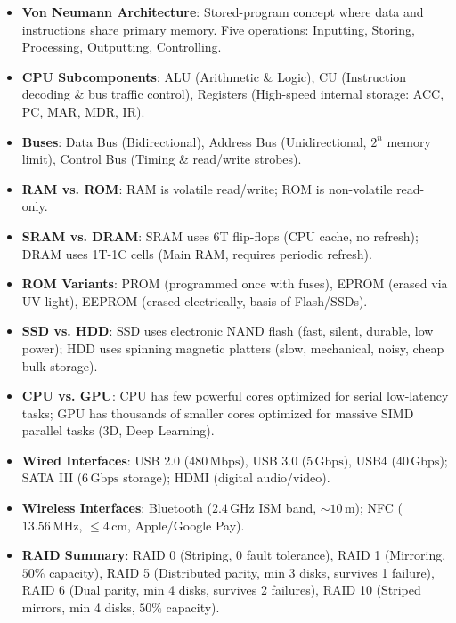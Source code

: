 \begin{quickrevision}
\begin{itemize}
    \item \textbf{Von Neumann Architecture}: Stored-program concept where data and instructions share primary memory. Five operations: Inputting, Storing, Processing, Outputting, Controlling.
    \item \textbf{CPU Subcomponents}: ALU (Arithmetic \& Logic), CU (Instruction decoding \& bus traffic control), Registers (High-speed internal storage: ACC, PC, MAR, MDR, IR).
    \item \textbf{Buses}: Data Bus (Bidirectional), Address Bus (Unidirectional, $2^n$ memory limit), Control Bus (Timing \& read/write strobes).
    \item \textbf{RAM vs. ROM}: RAM is volatile read/write; ROM is non-volatile read-only.
    \item \textbf{SRAM vs. DRAM}: SRAM uses 6T flip-flops (CPU cache, no refresh); DRAM uses 1T-1C cells (Main RAM, requires periodic refresh).
    \item \textbf{ROM Variants}: PROM (programmed once with fuses), EPROM (erased via UV light), EEPROM (erased electrically, basis of Flash/SSDs).
    \item \textbf{SSD vs. HDD}: SSD uses electronic NAND flash (fast, silent, durable, low power); HDD uses spinning magnetic platters (slow, mechanical, noisy, cheap bulk storage).
    \item \textbf{CPU vs. GPU}: CPU has few powerful cores optimized for serial low-latency tasks; GPU has thousands of smaller cores optimized for massive SIMD parallel tasks (3D, Deep Learning).
    \item \textbf{Wired Interfaces}: USB 2.0 ($480\,\text{Mbps}$), USB 3.0 ($5\,\text{Gbps}$), USB4 ($40\,\text{Gbps}$); SATA III ($6\,\text{Gbps}$ storage); HDMI (digital audio/video).
    \item \textbf{Wireless Interfaces}: Bluetooth ($2.4\,\text{GHz}$ ISM band, $\sim 10\,\text{m}$); NFC ($13.56\,\text{MHz}$, $\le 4\,\text{cm}$, Apple/Google Pay).
    \item \textbf{RAID Summary}: RAID 0 (Striping, $0$ fault tolerance), RAID 1 (Mirroring, $50\%$ capacity), RAID 5 (Distributed parity, min 3 disks, survives 1 failure), RAID 6 (Dual parity, min 4 disks, survives 2 failures), RAID 10 (Striped mirrors, min 4 disks, $50\%$ capacity).
\end{itemize}
\end{quickrevision}

